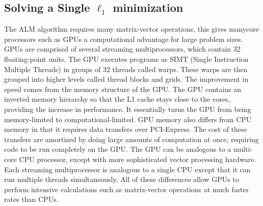 \documentclass[10pt,twocolumn,letterpaper]{article}
\begin{document}


\subsection{Solving a Single $\ell_1$ minimization}

The ALM algorithm requires many matrix-vector operations, this gives manycore
processors such as GPUs a computational advantage for large problem sizes.
GPUs are comprised of several streaming multiprocessors, which contain 32
floating-point units.  The GPU executes programs as SIMT (Single Instruction
Multiple Threads) in groups of 32 threads called warps.  These warps are then
grouped into higher levels called thread blocks and grids.  The improvement in
speed comes from the memory structure of the GPU.   The GPU contains an
inverted memory hierarchy so that the L1 cache stays close to the cores,
providing the increase in performance.  It essentially turns the GPU from being
memory-limited to computational-limited.  GPU memory also differs from CPU
memory in that it requires data transfers over PCI-Express.  The cost of these
transfers are amortized by doing large amounts of computation at once,
requiring code to be run completely on the GPU.  The GPU can be analogous to a
multi-core CPU processor, except with more sophisticated vector processing
hardware.  Each streaming multiprocessor is analogous to a single CPU except
that it can run multiple threads simultaneously.  All of these differences
allow GPUs to perform intensive calculations such as matrix-vector operations
at much faster rates than CPUs.

\end{document}
